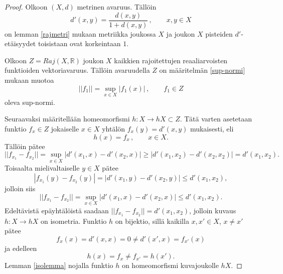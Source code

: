\documentclass[12pt,a4paper,leqno]{report}
\newcommand{\R}{\mathbb{R}}
\theoremstyle{plain}
\theoremstyle{definition}
\theoremstyle{remark}
\begin{document}
\begin{proof} Olkoon $(X,d)$ metrinen avaruus. Tällöin 
$$d'(x,y)=\dfrac{d(x,y)}{1+d(x,y)} \, , \qquad x,y\in X$$
on lemman \ref{rajmetri} mukaan metriikka joukossa $X$ ja joukon $X$ pisteiden $d'$-etäisyydet toisistaan ovat korkeintaan $1$.


Olkoon $Z=Raj(X,\R )$ joukon $X$ kaikkien rajoitettujen %
reaaliarvoisten funktioiden vektoriavaruus. Tällöin avaruudella $Z$ on määritelmän \ref{sup-normi} mukaan muotoa
$$||f_1||=\sup_{x\in X} |f_1(x)| \, , \qquad f_1\in Z$$
oleva sup-normi.

Seuraavaksi määritellään homeomorfismi $h\colon X\rightarrow hX\subset Z$. Tätä varten asetetaan funktio $f_x\in Z$ jokaiselle $x\in X$ yhtälön $f_x (y)=d'(x,y)$ mukaisesti, eli
$$h(x)=f_x\, ,\qquad x\in X. $$  Tällöin pätee 
$$||f_{x_1} - f_{x_2} ||=\sup_{x\in X} |d'(x_1 , x )-d'(x_2 , x )| \geq |d'(x_1 , x_2 )-d'(x_2 , x_2 )|=d'(x_1 ,x_2 ).$$ 
Toisaalta mielivaltaiselle $y\in X$ pätee
$$|f_{x_1} (y)- f_{x_2} (y)|=|d'(x_1 ,y )-d'(x_2 ,y)|\leq d'(x_1 , x_2 ),$$
jolloin siis $$||f_{x_1}-f_{x_2}||=\sup_{x\in X} |d'(x_1 , x )-d'(x_2 , x )|\leq d'(x_1 , x_2 ).$$ Edeltävistä epäyhtälöistä saadaan $||f_{x_1}-f_{x_2}||= d'(x_1 , x_2 )$, jolloin kuvaus $h\colon X\rightarrow hX$  on isometria.
Funktio $h$ on bijektio, sillä kaikilla $x,x'\in X$, $x\neq x'$ pätee 
$$ f_x (x)=d'(x,x)=0\neq d'(x',x)=f_{x'} (x)$$ 
ja edelleen 
$$h(x)=f_x \neq f_{x'}=h(x') .$$ 
Lemman \ref{isolemma} nojalla funktio $h$ on homeomorfismi kuvajoukolle $hX$.


\end{proof}
\end{document}
